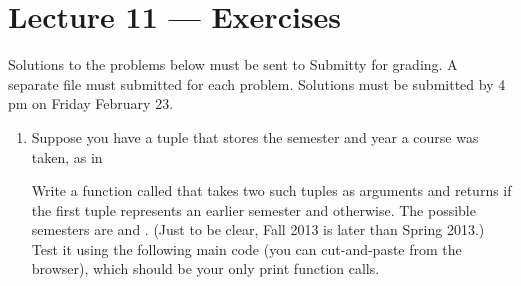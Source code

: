 \documentclass[letterpaper,10pt,english]{sphinxmanual}
\begin{document}
\chapter{Lecture 11 — Exercises}
\label{\detokenize{lecture_notes/lec11_conditionals_exercises/exercises:lecture-11-exercises}}\label{\detokenize{lecture_notes/lec11_conditionals_exercises/exercises::doc}}
Solutions to the problems below must be sent to Submitty for grading.
A separate file must submitted for each problem.  Solutions must be
submitted by 4 pm on Friday February 23.
\begin{enumerate}
\item {} 
Suppose you have a tuple that stores the semester and year a course
was taken, as in

%
\begin{sphinxVerbatim}[commandchars=\\\{\}]
  
\end{sphinxVerbatim}

Write a function called  that takes two
such tuples as arguments and returns  if the first tuple
represents an earlier semester and  otherwise. The
possible semesters are  and .  (Just to be
clear, Fall 2013 is later than Spring 2013.) Test it using the
following main code (you can cut-and-paste from the browser), which
should be your only print function calls.

%
\begin{sphinxVerbatim}[commandchars=\\\{\}]


\end{sphinxVerbatim}
\end{enumerate}
\end{document}
